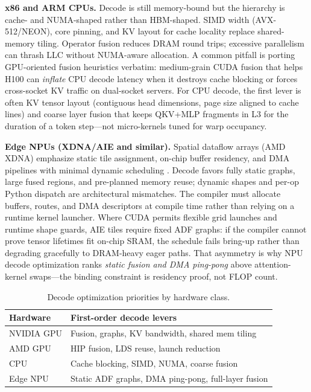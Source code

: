\textbf{x86 and ARM CPUs.} Decode is still memory-bound but the hierarchy is cache- and NUMA-shaped rather than HBM-shaped.
SIMD width (AVX-512/NEON), core pinning, and KV layout for cache locality replace shared-memory tiling.
Operator fusion reduces DRAM round trips; excessive parallelism can thrash LLC without NUMA-aware allocation.
A common pitfall is porting GPU-oriented fusion heuristics verbatim: medium-grain CUDA fusion that helps H100 can \emph{inflate} CPU decode latency when it destroys cache blocking or forces cross-socket KV traffic on dual-socket servers.
For CPU decode, the first lever is often KV tensor layout (contiguous head dimensions, page size aligned to cache lines) and coarse layer fusion that keeps QKV+MLP fragments in L3 for the duration of a token step---not micro-kernels tuned for warp occupancy.

\textbf{Edge NPUs (XDNA/AIE and similar).} Spatial dataflow arrays (AMD XDNA) emphasize static tile assignment, on-chip buffer residency, and DMA pipelines with minimal dynamic scheduling \citep{amd2024xdna,amd2024aie}.
Decode favors fully static graphs, large fused regions, and pre-planned memory reuse; dynamic shapes and per-op Python dispatch are architectural mismatches.
The compiler must allocate buffers, routes, and DMA descriptors at compile time rather than relying on a runtime kernel launcher.
Where CUDA permits flexible grid launches and runtime shape guards, AIE tiles require fixed ADF graphs: if the compiler cannot prove tensor lifetimes fit on-chip SRAM, the schedule fails bring-up rather than degrading gracefully to DRAM-heavy eager paths.
That asymmetry is why NPU decode optimization ranks \emph{static fusion and DMA ping-pong} above attention-kernel swaps---the binding constraint is residency proof, not FLOP count.

\begin{table}[t]
\centering
\caption{Decode optimization priorities by hardware class.}
\label{tab:hw_priorities}
\begin{tabular}{lp{3.2in}}
\toprule
\textbf{Hardware} & \textbf{First-order decode levers} \\
\midrule
NVIDIA GPU & Fusion, graphs, KV bandwidth, shared mem tiling \\
AMD GPU & HIP fusion, LDS reuse, launch reduction \\
CPU & Cache blocking, SIMD, NUMA, coarse fusion \\
Edge NPU & Static ADF graphs, DMA ping-pong, full-layer fusion \\
\bottomrule
\end{tabular}
\end{table}

